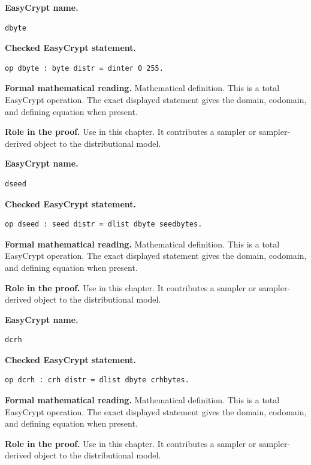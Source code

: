 \begin{formaldefinition}
\noindent\textbf{EasyCrypt name.}
\begin{lstlisting}[language=EasyCrypt,basicstyle=\ttfamily\scriptsize]
dbyte
\end{lstlisting}
\noindent\textbf{Checked EasyCrypt statement.}
\begin{lstlisting}[language=EasyCrypt,basicstyle=\ttfamily\scriptsize]
op dbyte : byte distr = dinter 0 255.
\end{lstlisting}
\noindent\textbf{Formal mathematical reading.}
Mathematical definition. This is a total EasyCrypt operation.  The exact displayed statement gives the domain, codomain, and defining equation when present.

\noindent\textbf{Role in the proof.}
Use in this chapter. It contributes a sampler or sampler-derived object to the distributional model.

\end{formaldefinition}

\begin{formaldefinition}
\noindent\textbf{EasyCrypt name.}
\begin{lstlisting}[language=EasyCrypt,basicstyle=\ttfamily\scriptsize]
dseed
\end{lstlisting}
\noindent\textbf{Checked EasyCrypt statement.}
\begin{lstlisting}[language=EasyCrypt,basicstyle=\ttfamily\scriptsize]
op dseed : seed distr = dlist dbyte seedbytes.
\end{lstlisting}
\noindent\textbf{Formal mathematical reading.}
Mathematical definition. This is a total EasyCrypt operation.  The exact displayed statement gives the domain, codomain, and defining equation when present.

\noindent\textbf{Role in the proof.}
Use in this chapter. It contributes a sampler or sampler-derived object to the distributional model.

\end{formaldefinition}

\begin{formaldefinition}
\noindent\textbf{EasyCrypt name.}
\begin{lstlisting}[language=EasyCrypt,basicstyle=\ttfamily\scriptsize]
dcrh
\end{lstlisting}
\noindent\textbf{Checked EasyCrypt statement.}
\begin{lstlisting}[language=EasyCrypt,basicstyle=\ttfamily\scriptsize]
op dcrh : crh distr = dlist dbyte crhbytes.
\end{lstlisting}
\noindent\textbf{Formal mathematical reading.}
Mathematical definition. This is a total EasyCrypt operation.  The exact displayed statement gives the domain, codomain, and defining equation when present.

\noindent\textbf{Role in the proof.}
Use in this chapter. It contributes a sampler or sampler-derived object to the distributional model.

\end{formaldefinition}


